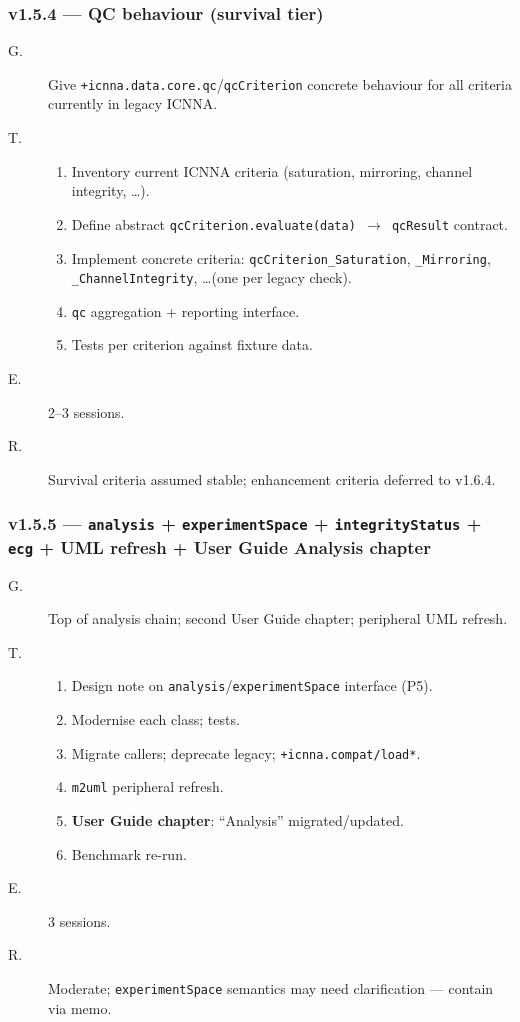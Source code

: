 \documentclass[11pt,a4paper]{article}
\begin{document}
\subsubsection*{v1.5.4 --- QC behaviour (survival tier)}

\begin{description}
    \item[G.] Give \texttt{+icnna.data.core.qc}/\texttt{qcCriterion} concrete behaviour for all criteria currently in legacy ICNNA.
    \item[T.]
        \begin{enumerate}[nosep]
            \item Inventory current ICNNA criteria (saturation, mirroring, channel integrity, \ldots).
            \item Define abstract \texttt{qcCriterion.evaluate(data) $\to$ qcResult} contract.
            \item Implement concrete criteria: \texttt{qcCriterion\_Saturation}, \texttt{\_Mirroring}, \texttt{\_ChannelIntegrity}, \ldots (one per legacy check).
            \item \texttt{qc} aggregation + reporting interface.
            \item Tests per criterion against fixture data.
        \end{enumerate}
    \item[E.] 2--3 sessions.
    \item[R.] Survival criteria assumed stable; enhancement criteria deferred to v1.6.4.
\end{description}

\subsubsection*{v1.5.5 --- \texttt{analysis} + \texttt{experimentSpace} + \texttt{integrityStatus} + \texttt{ecg} + UML refresh + User Guide Analysis chapter}

\begin{description}
    \item[G.] Top of analysis chain; second User Guide chapter; peripheral UML refresh.
    \item[T.]
        \begin{enumerate}[nosep]
            \item Design note on \texttt{analysis}/\texttt{experimentSpace} interface (P5).
            \item Modernise each class; tests.
            \item Migrate callers; deprecate legacy; \texttt{+icnna.compat/load*}.
            \item \texttt{m2uml} peripheral refresh.
            \item \textbf{User Guide chapter}: ``Analysis'' migrated/updated.
            \item Benchmark re-run.
        \end{enumerate}
    \item[E.] 3 sessions.
    \item[R.] Moderate; \texttt{experimentSpace} semantics may need clarification --- contain via memo.
\end{description}
\end{document}
